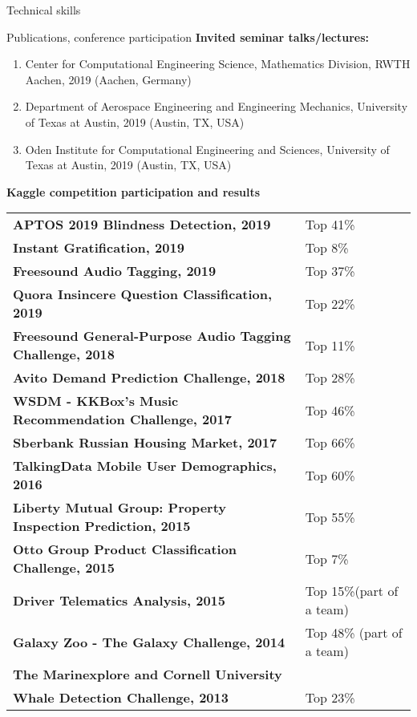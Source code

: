 \documentclass{resume} %
\begin{document}
\begin{rSection}{Technical skills}
\begin{rSection}{Publications, conference participation}
{\bf Invited seminar talks/lectures:}
\begin{enumerate}
    \item Center for Computational Engineering Science, Mathematics Division, RWTH Aachen, 2019 (Aachen, Germany)
    \item Department of Aerospace Engineering and Engineering Mechanics, University of Texas at Austin, 2019 (Austin, TX, USA)
    \item Oden Institute for Computational Engineering and Sciences, University of Texas at Austin, 2019 (Austin, TX, USA)
\end{enumerate}


\end{rSection}

\pagebreak

{\bf Kaggle competition participation and results}

\begin{tabular}{ @{} >{\bfseries}l @{\hspace{6ex}} l }
APTOS 2019 Blindness Detection, 2019 & Top 41\% \\
Instant Gratification, 2019 & Top 8\% \\
Freesound Audio Tagging, 2019 & Top 37\% \\
Quora Insincere Question Classification, 2019 & Top 22\% \\
Freesound General-Purpose Audio Tagging Challenge, 2018 & Top 11\% \\
Avito Demand Prediction Challenge, 2018 & Top 28\% \\
WSDM - KKBox's Music Recommendation Challenge, 2017 & Top 46\% \\
Sberbank Russian Housing Market, 2017 & Top 66\% \\
TalkingData Mobile User Demographics, 2016 & Top 60\% \\
Liberty Mutual Group: Property Inspection Prediction, 2015 & Top 55\% \\
Otto Group Product Classification Challenge, 2015 & Top 7\% \\ 
Driver Telematics Analysis, 2015 & Top 15\%(part of a team) \\ 
Galaxy Zoo - The Galaxy Challenge, 2014 & Top 48\% (part of a team) \\
The Marinexplore and Cornell University & \\
Whale Detection Challenge, 2013 & Top 23\%
\end{tabular}


\end{rSection}


\end{document}
